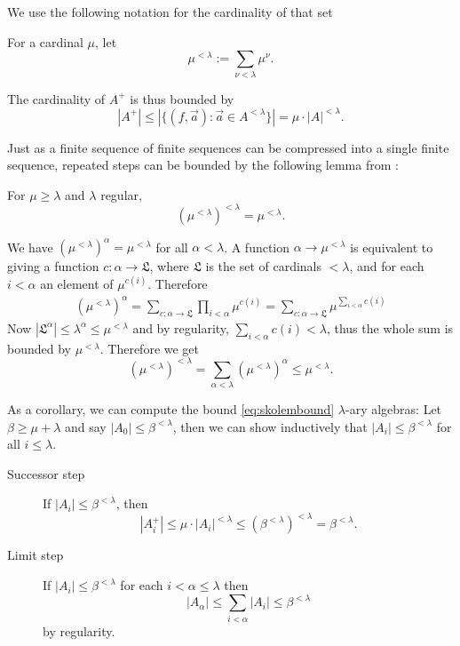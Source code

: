 We use the following notation for the cardinality of that set
\begin{Definition}
For a cardinal $\mu$, let
\[ \mu^{< \lambda} := \sum_{\nu < \lambda} \mu^\nu. \]
\end{Definition}

The cardinality of $A^+$ is thus bounded by
\[ |A^+| \leq |\{ (f,\vec a) : \vec a \in A^{< \lambda} \}| = \mu \cdot |A|^{< \lambda}. \]

Just as a finite sequence of finite sequences can be compressed into a single finite sequence, repeated steps can be bounded by the following lemma from \cite[\nopp~2.10]{AdamekRosicky}:

\begin{Lemma}
For $\mu \geq \lambda$ and $\lambda$ regular, 
\[ \left(\mu^{< \lambda}\right)^{< \lambda} = \mu^{< \lambda}. \]
\end{Lemma}
\begin{Proof}
We have $(\mu^{< \lambda})^\alpha = \mu^{< \lambda}$ for all $\alpha < \lambda$. A function $\alpha \to \mu^{< \lambda}$ is equivalent to giving a function $c : \alpha \to \mathfrak L$, where $\mathfrak L$ is the set of cardinals $< \lambda$, and for each $i< \alpha$ an element of $\mu^{c(i)}$. Therefore 
\begin{align*}
(\mu^{< \lambda})^\alpha = \sum_{c : \alpha \to \mathfrak L} \prod_{i < \alpha} \mu^{c(i)} 
= \sum_{c : \alpha \to \mathfrak L} \mu^{\sum_{i < \alpha} c(i)}
\end{align*}
Now $|\mathfrak L^\alpha| \leq \lambda^\alpha \leq \mu^{< \lambda}$ and by regularity, $\sum_{i < \alpha} c(i) < \lambda$, thus the whole sum is bounded by $\mu^{< \lambda}$. Therefore we get
\[ (\mu^{< \lambda})^{< \lambda} = \sum_{\alpha < \lambda} (\mu^{< \lambda})^\alpha \leq \mu^{< \lambda}. \]
\end{Proof}

As a corollary, we can compute the bound \eqref{eq:skolembound} $\lambda$-ary algebras: Let $\beta \geq \mu + \lambda$ and say $|A_0| \leq \beta^{< \lambda}$, then we can show inductively that $|A_i| \leq \beta^{< \lambda}$ for all $i \leq \lambda$.
\begin{description}
\item[Successor step] If $|A_i| \leq \beta^{< \lambda}$, then
\[ |A_i^+| \leq \mu \cdot |A_i|^{< \lambda} \leq \left(\beta^{< \lambda}\right)^{< \lambda} = \beta^{< \lambda}. \]
\item[Limit step] If $|A_i| \leq \beta^{< \lambda}$ for each $i < \alpha \leq \lambda$ then
\[ |A_\alpha| \leq \sum_{i < \alpha} |A_i| \leq \beta^{< \lambda} \]
by regularity.
\end{description}


